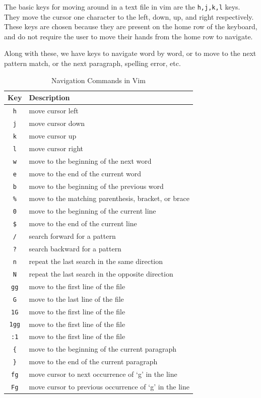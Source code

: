 The basic keys for moving around in a text file in vim
are the \texttt{h,j,k,l} keys. They move the cursor
one character to the left, down, up, and right respectively.
These keys are chosen because they are present on the
home row of the keyboard, and do not require the user
to move their hands from the home row to navigate.

Along with these, we have keys to navigate word by word,
or to move to the next pattern match, or the next
paragraph, spelling error, etc.

\begin{table}[h!]
  \caption{Navigation Commands in Vim}
  \begin{tabular}{c l}
    \toprule
    Key & Description \\
    \midrule
    \texttt{h} & move cursor left \\
    \texttt{j} & move cursor down \\
    \texttt{k} & move cursor up \\
    \texttt{l} & move cursor right \\
    \texttt{w} & move to the beginning of the next word \\
    \texttt{e} & move to the end of the current word \\
    \texttt{b} & move to the beginning of the previous word \\
    \texttt{\%} & move to the matching parenthesis, bracket, or brace \\
    \texttt{0} & move to the beginning of the current line \\
    \texttt{\$} & move to the end of the current line \\
    \texttt{/} & search forward for a pattern \\
    \texttt{?} & search backward for a pattern \\
    \texttt{n} & repeat the last search in the same direction \\
    \texttt{N} & repeat the last search in the opposite direction \\
    \texttt{gg} & move to the first line of the file \\
    \texttt{G} & move to the last line of the file \\
    \texttt{1G} & move to the first line of the file \\
    \texttt{1gg} & move to the first line of the file \\
    \texttt{:1} & move to the first line of the file \\
    \texttt{\{} & move to the beginning of the current paragraph \\
    \texttt{\}} & move to the end of the current paragraph \\
    \texttt{fg} & move cursor to next occurrence of `g' in the line \\
    \texttt{Fg} & move cursor to previous occurrence of `g' in the line \\
    \bottomrule
  \end{tabular}
\end{table}


